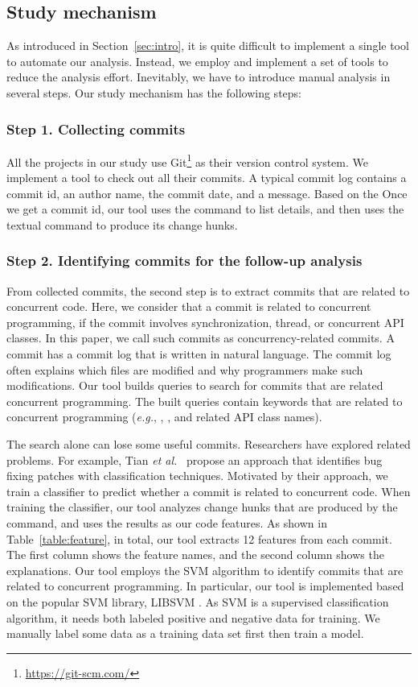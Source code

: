 \subsection{Study mechanism}
\label{sec:method:tool}
As introduced in Section~\ref{sec:intro}, it is quite difficult to implement a single tool to automate our analysis. Instead, we employ and implement a set of tools to reduce the analysis effort. Inevitably, we have to introduce manual analysis in several steps. Our study mechanism has the following steps:

\subsubsection{Step 1. Collecting commits} All the projects in our study use Git\footnote{\url{https://git-scm.com/}} as their version control system. We implement a tool to check out all their commits. A typical commit log contains a commit id, an author name, the commit date, and a message. Based on the Once we get a commit id, our tool uses the  command to list details, and then uses the textual  command to produce its change hunks.

\subsubsection{Step 2. Identifying commits for the follow-up analysis} From collected commits, the second step is to extract commits that are related to concurrent code. Here, we consider that a commit is related to concurrent programming, if the commit involves synchronization, thread, or concurrent API classes. In this paper, we call such commits as concurrency-related commits. A commit has a commit log that is written in natural language. The commit log often explains which files are modified and why programmers make such modifications. Our tool builds queries to search for commits that are related concurrent programming. The built queries contain keywords that are related to concurrent programming (\emph{e.g.}, , , and related API class names).

The search alone can lose some useful commits. Researchers have explored related problems. For example, Tian \emph{et al.}~\cite{tian2012identifying} propose an approach that identifies bug fixing patches with classification techniques. Motivated by their approach, we train a classifier to predict whether a commit is related to concurrent code. When training the classifier, our tool analyzes change hunks that are produced by the  command, and uses the results as our code features. As shown in Table~\ref{table:feature}, in total, our tool extracts 12 features from each commit. The first column shows the feature names, and the second column shows the explanations.
Our tool employs the SVM \cite{journals/ml/CortesV95} algorithm to identify commits that are related to concurrent programming. In particular, our tool is implemented based on the popular SVM library, LIBSVM \cite{libsvm}. As SVM is a supervised classification algorithm, it needs both labeled positive and negative data for training. We manually label some data as a training data set first then train a model. 

